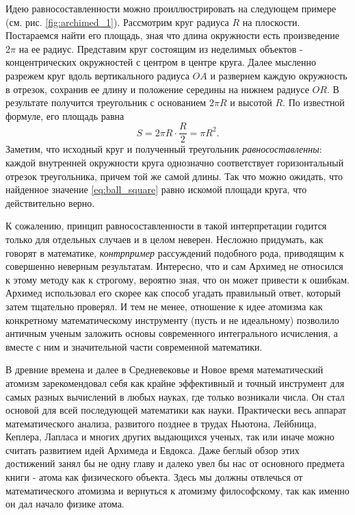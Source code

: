 Идею равносоставленности можно проиллюстрировать на следующем примере (см. рис. \ref{fig:archimed_1}).
Рассмотрим круг радиуса $R$ на плоскости.
Постараемся найти его площадь, зная что длина окружности есть произведение $2\pi$ на ее радиус.
Представим круг состоящим из неделимых объектов - концентрических окружностей с центром в центре круга.
Далее мысленно разрежем круг вдоль вертикального радиуса $OA$ и развернем каждую окружность в отрезок, сохранив ее длину и положение середины на нижнем радиусе $OR$.
В результате получится треугольник с основанием $2\pi R$ и высотой $R$.
По известной формуле, его площадь равна
\begin{equation}\label{eq:ball_square}
S = 2\pi R\cdot\frac{R}{2} = \pi R^2.
\end{equation}
Заметим, что исходный круг и полученный треугольник \textit{равносоставленны}: каждой внутренней окружности круга однозначно соответствует горизонтальный отрезок треугольника, причем той же самой длины.
Так что можно ожидать, что найденное значение \ref{eq:ball_square} равно искомой площади круга, что действительно верно.

К сожалению, принцип равносоставленности в такой интерпретации годится только для отдельных случаев и в целом неверен. 
Несложно придумать, как говорят в математике, \textit{контрпример} рассуждений подобного рода, приводящим к совершенно неверным результатам.
Интересно, что и сам Архимед не относился к этому методу как к строгому, вероятно зная, что он может привести к ошибкам.
Архимед использовал его скорее как способ угадать правильный ответ, который затем тщательно проверял.
И тем не менее, отношение к идее атомизма как конкретному математическому инструменту (пусть и не идеальному) позволило античным ученым заложить основы современного интегрального исчисления, а вместе с ним и значительной части современной математики.

В древние времена и далее в Средневековье и Новое время математический атомизм зарекомендовал себя как крайне эффективный и точный инструмент для самых разных вычислений в любых науках, где только возникали числа. 
Он стал основой для всей последующей математики как науки.
Практически весь аппарат математического анализа, развитого позднее в трудах Ньютона, Лейбница, Кеплера, Лапласа и многих других выдающихся ученых, так или иначе можно считать развитием идей Архимеда и Евдокса.
Даже беглый обзор этих достижений занял бы не одну главу и далеко увел бы нас от основного предмета книги - атома как физического объекта.
Здесь мы должны отвлечься от математического атомизма и вернуться к атомизму философскому, так как именно он дал начало физике атома.


